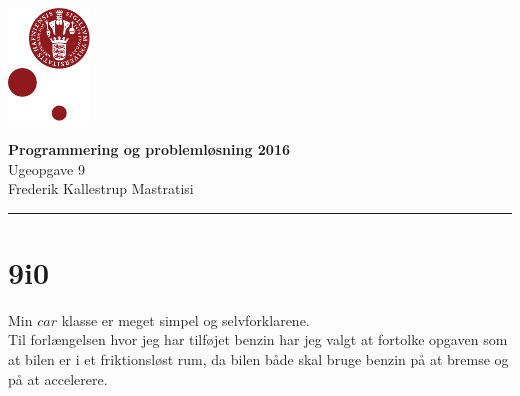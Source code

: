 \documentclass[12pt, a4paper, hidelinks]{article}
\begin{document}
\begin{minipage}[b]{1.0\linewidth}
\includegraphics[height=30mm]{KULogo}

\vspace*{-16ex}
\begin{center}
    {\Large \bf Programmering og problemløsning 2016} \vspace*{1ex} \\
    {\large Ugeopgave 9} \vspace*{1ex} \\
    {\large Frederik Kallestrup Mastratisi}
\end{center}
\vspace*{-3pt}
{\color{KU-red}\hrule}
\end{minipage}
\vspace{2ex}

\tableofcontents \newpage

\setcounter{section}{0}
\setcounter{subsection}{-1}


\section{9i0}
Min $car$ klasse er meget simpel og selvforklarene. \\

Til forlængelsen hvor jeg har tilføjet benzin har jeg valgt at fortolke opgaven som at bilen er i et friktionsløst rum, da bilen både skal bruge benzin på at bremse og på at accelerere.





\end{document}
